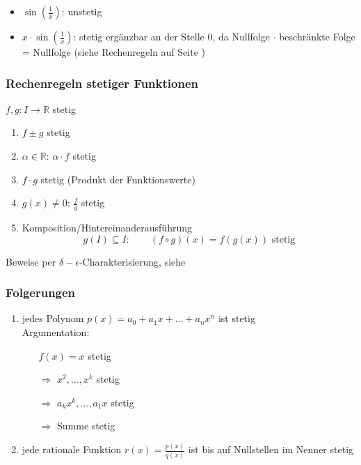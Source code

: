 
\begin{example}
  \begin{itemize}
    \item $\sin(\frac 1 x)$: unstetig
    \item $x \cdot \sin(\frac 1 x)$: stetig ergänzbar an der Stelle 0, da Nullfolge $\cdot$ beschränkte Folge = Nullfolge (siehe Rechenregeln auf Seite \pageref{ssub:nullfolgen})
  \end{itemize}
\end{example}

\subsubsection*{Rechenregeln stetiger Funktionen}

$f, g: I \to \mathbb{R}$ stetig

\begin{enumerate}
  \item $f\pm g$ stetig
  \item $\alpha \in \mathbb{R}$: $\alpha \cdot f$ stetig
  \item $f \cdot g$ stetig (Produkt der Funktionswerte)
  \item $g(x) \neq 0$: $\frac f g$ stetig
  \item Komposition/Hintereinanderausführung
    \begin{equation*}
      g(I) \subseteq I: \qquad (f \circ g)(x) = f(g(x)) \text{ stetig}
    \end{equation*}
\end{enumerate}
%
Beweise per $\delta-\epsilon$-Charakterisierung, siehe \cite{bornemann}

\subsubsection*{Folgerungen}

  \begin{enumerate}
    \item jedes Polynom $p(x) = a_0 + a_1 x + \ldots + a_n x^n$ ist stetig\\
      Argumentation:
      \begin{itemize}
        \item[] $f(x) = x$ stetig
        \item[$\Rightarrow$] $x^2, \ldots, x^k$ stetig
        \item[$\Rightarrow$] $a_k x^k, \ldots, a_1 x$ stetig
        \item[$\Rightarrow$] Summe stetig
      \end{itemize}
    \item jede rationale Funktion $r(x) = \frac{p(x)}{q(x)}$ ist bis auf Nullstellen im Nenner stetig
  \end{enumerate}

